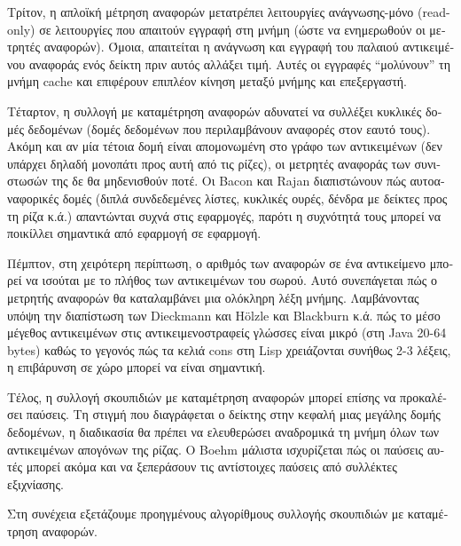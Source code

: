 \begin{greek}
Τρίτον, η απλοϊκή μέτρηση αναφορών μετατρέπει λειτουργίες
ανάγνωσης-μόνο (read-only) σε λειτουργίες που απαιτούν εγγραφή
στη μνήμη (ώστε να ενημερωθούν οι μετρητές αναφορών). Όμοια,
απαιτείται η ανάγνωση και εγγραφή του παλαιού αντικειμένου
αναφοράς ενός δείκτη πριν αυτός αλλάξει τιμή. Αυτές οι εγγραφές
``μολύνουν'' τη μνήμη cache και επιφέρουν επιπλέον κίνηση μεταξύ
μνήμης και επεξεργαστή.

Τέταρτον, η συλλογή με καταμέτρηση αναφορών αδυνατεί να συλλέξει
κυκλικές δομές δεδομένων (δομές δεδομένων που περιλαμβάνουν
αναφορές στον εαυτό τους). Ακόμη και αν μία τέτοια δομή είναι
απομονωμένη στο γράφο των αντικειμένων (δεν υπάρχει δηλαδή
μονοπάτι προς αυτή από τις ρίζες), οι μετρητές αναφοράς των
συνιστωσών της δε θα μηδενισθούν ποτέ. Οι Bacon και Rajan
\cite{DBLP:conf/ecoop/BaconR01} διαπιστώνουν πώς αυτοαναφορικές
δομές (διπλά συνδεδεμένες λίστες, κυκλικές ουρές, δένδρα με
δείκτες προς τη ρίζα κ.ά.) απαντώνται συχνά στις εφαρμογές,
παρότι η συχνότητά τους μπορεί να ποικίλλει σημαντικά από
εφαρμογή σε εφαρμογή.

Πέμπτον, στη χειρότερη περίπτωση, ο αριθμός των αναφορών σε
ένα αντικείμενο μπορεί να ισούται με το πλήθος των αντικειμένων
του σωρού. Αυτό συνεπάγεται πώς ο μετρητής αναφορών θα
καταλαμβάνει μια ολόκληρη λέξη μνήμης. Λαμβάνοντας υπόψη την
διαπίστωση των Dieckmann και H{\"o}lzle
\cite{DBLP:conf/ecoop/DieckmannH99} και Blackburn
κ.ά. \cite{DBLP:conf/oopsla/BlackburnGHKMBDFFGHHJLMPSVDW06}
πώς το μέσο μέγεθος αντικειμένων στις αντικειμενοστραφείς
γλώσσες είναι μικρό (στη Java 20-64 bytes) καθώς το γεγονός
πώς τα κελιά cons στη Lisp χρειάζονται συνήθως 2-3 λέξεις,
η επιβάρυνση σε χώρο μπορεί να είναι σημαντική.

Τέλος, η συλλογή σκουπιδιών με καταμέτρηση αναφορών μπορεί
επίσης να προκαλέσει παύσεις. Τη στιγμή που διαγράφεται ο
δείκτης στην κεφαλή μιας μεγάλης δομής δεδομένων, η διαδικασία 
 θα πρέπει να ελευθερώσει αναδρομικά
τη μνήμη όλων των αντικειμένων απογόνων της ρίζας. Ο Boehm
\cite{DBLP:conf/popl/Boehm04} μάλιστα ισχυρίζεται πώς οι
παύσεις αυτές μπορεί ακόμα και να ξεπεράσουν τις αντίστοιχες
παύσεις από συλλέκτες εξιχνίασης.

Στη συνέχεια εξετάζουμε προηγμένους αλγορίθμους συλλογής
σκουπιδιών με καταμέτρηση αναφορών.


\end{greek}
